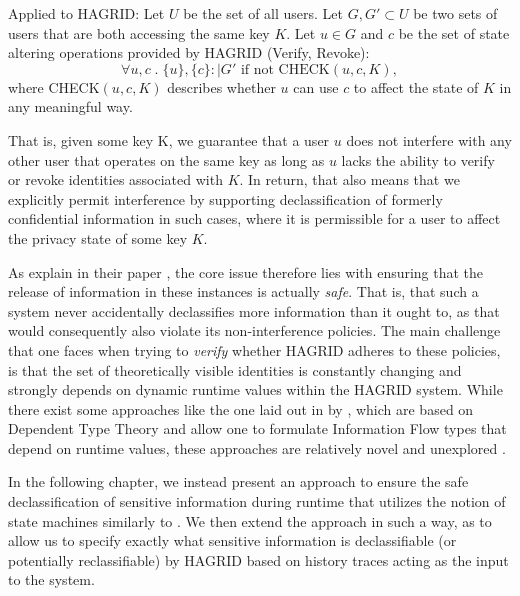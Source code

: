 Applied to HAGRID: Let \(U\) be the set of all users. Let \(G,G' \subset U\) be two sets of users that are both accessing the same key \(K\). Let \(u \in G\) and \(c\) be the set of state altering operations provided by HAGRID (Verify, Revoke): 
\[
    \forall u,c \;.\; \{u\}, \{c\} :\mid G' \text{ if not } \text{CHECK}(u,c,K),
\]
where CHECK\((u,c,K)\) describes whether \(u\) can use \(c\) to affect the state of \(K\) in any meaningful way.

That is, given some key K, we guarantee that a user \(u\) does not interfere with any other user that operates on the same key as long as \(u\) lacks the ability to verify or revoke identities associated with \(K\). 
In return, that also means that we explicitly permit interference by supporting declassification of formerly confidential information in such cases, where it is permissible for a user to affect the privacy state of some key \(K\).

As \citeauthor{declass_dim_prin} explain in their paper , the core issue therefore lies with ensuring that the release of information in these instances is actually \emph{safe}\cite{declass_dim_prin}. That is, that such a system never accidentally declassifies more information than it ought to, as that would consequently also violate its non-interference policies.
The main challenge that one faces when trying to \emph{verify} whether HAGRID adheres to these policies, is that the set of theoretically visible identities is constantly changing and strongly depends on dynamic runtime values within the HAGRID system. 
While there exist some approaches like the one laid out in  by \citeauthor{Lourenco_Caires_15}, which are based on Dependent Type Theory and allow one to formulate Information Flow types that depend on runtime values, these approaches are relatively novel and unexplored \cite{Lourenco_Caires_15}.

In the following chapter, we instead present an approach to ensure the safe declassification of sensitive information during runtime that utilizes the notion of state machines similarly to \citeauthor{Goguen_Meseguer_82}. We then extend the approach in such a way, as to allow us to specify exactly what sensitive information is declassifiable (or potentially reclassifiable) by HAGRID based on history traces acting as the input to the system.

